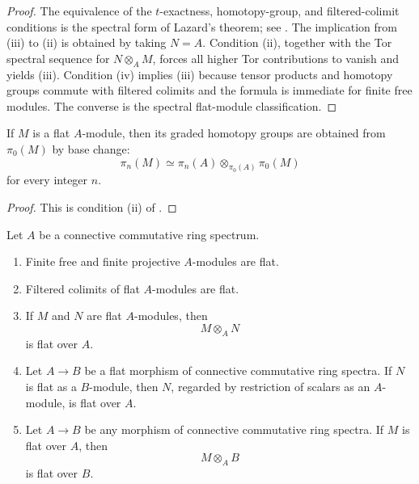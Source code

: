 \begin{proof}
The equivalence of the $t$-exactness, homotopy-group, and filtered-colimit
conditions is the spectral form of Lazard's theorem; see
\cite{LurieHigherAlgebra,LurieSAG}. The implication from (iii) to (ii) is
obtained by taking $N=A$. Condition (ii), together with the Tor spectral
sequence for $N\otimes_A M$, forces all higher Tor contributions to
vanish and yields (iii). Condition (iv) implies (iii) because tensor
products and homotopy groups commute with filtered colimits and the formula
is immediate for finite free modules. The converse is the spectral
flat-module classification.
\end{proof}

\begin{corollary}
\label{cor:flat-modules-detected-homotopy}
If $M$ is a flat $A$-module, then its graded homotopy groups are obtained
from $\pi_0(M)$ by base change:
\[
    \pi_n(M)
    \simeq
    \pi_n(A)
    \otimes_{\pi_0(A)}
    \pi_0(M)
\]
for every integer $n$.
\end{corollary}

\begin{proof}
This is condition (ii) of .
\end{proof}

\begin{proposition}
\label{prop:flat-module-permanence}
Let $A$ be a connective commutative ring spectrum.
\begin{enumerate}[label=(\roman*)]
    \item Finite free and finite projective $A$-modules are flat.

    \item Filtered colimits of flat $A$-modules are flat.

    \item If $M$ and $N$ are flat $A$-modules, then
    \[
        M\otimes_A N
    \]
    is flat over $A$.

    \item Let $A\to B$ be a flat morphism of connective commutative ring
    spectra. If $N$ is flat as a $B$-module, then $N$, regarded by
    restriction of scalars as an $A$-module, is flat over $A$.

    \item Let $A\to B$ be any morphism of connective commutative ring
    spectra. If $M$ is flat over $A$, then
    \[
        M\otimes_A B
    \]
    is flat over $B$.
\end{enumerate}
\end{proposition}

